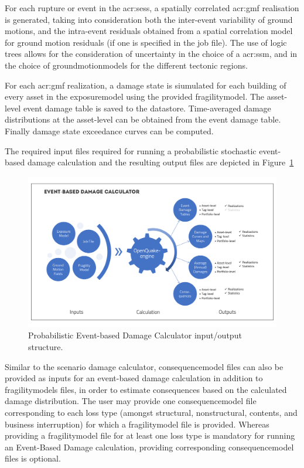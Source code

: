 For each \gls{rupture} or event in the \glspl{acr:ses}, a spatially correlated
\gls{acr:gmf} realisation is generated, taking into consideration both the
inter-event variability of ground motions, and the intra-event residuals
obtained from a spatial correlation model for ground motion residuals (if one 
is specified in the job file). The use of logic trees allows for the 
consideration of uncertainty in the choice of a \glsdesc{acr:ssm}, and in the 
choice of \glspl{groundmotionmodel} for the different tectonic regions.

For each \gls{acr:gmf} realization, a damage state is siumulated for each
building of every \gls{asset} in the \gls{exposuremodel} using the provided
\gls{fragilitymodel}. The asset-level event damage table is saved to the datastore.
Time-averaged damage distributions at the asset-level can be obtained from
the event damage table. Finally damage state exceedance curves can be computed.

The required input files required for running a probabilistic stochastic
event-based damage calculation and the resulting output files are depicted in
Figure~\ref{fig:io-structure-event-based-damage}

\begin{figure}[ht]
\centering
\includegraphics[width=12cm]{figures/risk/io-structure-event-based-damage.pdf}
\caption{Probabilistic Event-based Damage Calculator input/output structure.}
\label{fig:io-structure-event-based-damage}
\end{figure}

Similar to the scenario damage calculator, \gls{consequencemodel} files can also be
provided as inputs for an event-based damage calculation in addition to
\glspl{fragilitymodel} files, in order to estimate consequences based on the
calculated damage distribution. The user may provide one
\gls{consequencemodel} file corresponding to each loss type (amongst
structural, nonstructural, contents, and business interruption) for which a
\gls{fragilitymodel} file is provided. Whereas providing a
\gls{fragilitymodel} file for at least one loss type is mandatory for running
an Event-Based Damage calculation, providing corresponding \gls{consequencemodel}
files is optional.
